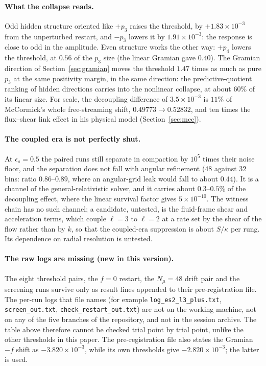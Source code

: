 \paragraph{What the collapse reads.} Odd hidden structure oriented like $+p_3$ raises the threshold, by $+1.83\times10^{-3}$ from the unperturbed restart, and $-p_3$ lowers it by $1.91\times10^{-3}$: the response is close to odd in the amplitude. Even structure works the other way: $+p_4$ lowers the threshold, at $0.56$ of the $p_3$ size (the linear Gramian gave $0.40$). The Gramian direction of Section~\ref{sec:gramian} moves the threshold $1.47$ times as much as pure $p_3$ at the same positivity margin, in the same direction: the predictive-quotient ranking of hidden directions carries into the nonlinear collapse, at about $60\%$ of its linear size. For scale, the decoupling difference of $3.5\times10^{-3}$ is $11\%$ of McCormick's whole free-streaming shift, $0.49773\to0.52832$, and ten times the flux--shear link effect in his physical model (Section~\ref{sec:mcc}).

\paragraph{The coupled era is not perfectly shut.} At $\epsilon_s=0.5$ the paired runs still separate in compaction by $10^5$ times their noise floor, and the separation does not fall with angular refinement ($48$ against $32$ bins: ratio $0.86$--$0.89$, where an angular-grid leak would fall to about $0.44$). It is a channel of the general-relativistic solver, and it carries about $0.3$--$0.5\%$ of the decoupling effect, where the linear survival factor gives $5\times10^{-10}$. The witness chain has no such channel; a candidate, untested, is the fluid-frame shear and acceleration terms, which couple $\ell=3$ to $\ell=2$ at a rate set by the shear of the flow rather than by $k$, so that the coupled-era suppression is about $S/\kappa$ per rung. Its dependence on radial resolution is untested.

\paragraph{The raw logs are missing (new in this version).} The eight threshold pairs, the $f=0$ restart, the $N_\mu=48$ drift pair and the screening runs survive only as result lines appended to their pre-registration file. The per-run logs that file names (for example \texttt{log\_es2\_l3\_plus.txt}, \texttt{screen\_out.txt}, \texttt{check\_restart\_out.txt}) are not on the working machine, not on any of the five branches of the repository, and not in the session archive. The table above therefore cannot be checked trial point by trial point, unlike the other thresholds in this paper. The pre-registration file also states the Gramian $-f$ shift as $-3.820\times10^{-3}$, while its own thresholds give $-2.820\times10^{-3}$; the latter is used.


